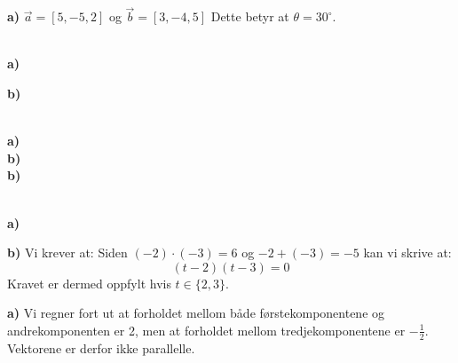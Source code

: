 \textbf{a)} $ \vec{a}=[ 5 ,-5,  2]$ og $ \vec{b}=[ 3 ,-4 , 5] $
Dette betyr at $ \theta=30^\circ $.

 \\
\textbf{a)} \se{}

\textbf{b)} 

 \\
\textbf{a)} \\
\textbf{b)}  \\
\textbf{b)} 

\\
\textbf{a)} 

\textbf{b)} Vi krever at:
Siden $ (-2)\cdot(-3) = 6 $ og $ -2+(-3)=-5 $ kan vi skrive at:
\[ (t-2)(t-3)=0 \]
Kravet er dermed oppfylt hvis $ t\in\lbrace2, 3\rbrace $. 

\textbf{a)} Vi regner fort ut at forholdet mellom både førstekomponentene og andrekomponenten er 2, men at forholdet mellom tredjekomponentene er $ -\frac{1}{2} $. Vektorene er derfor ikke parallelle.

